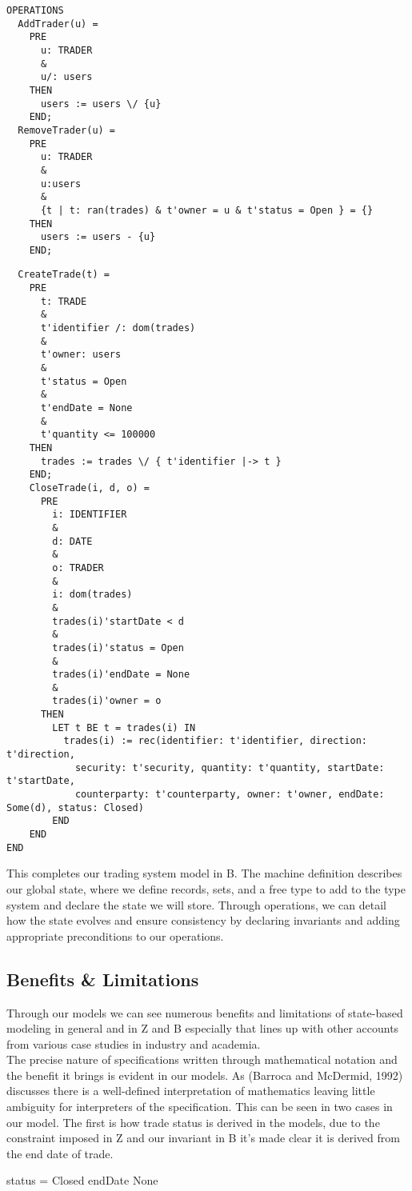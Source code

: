 \documentclass{article}
\begin{document}
\begin{verbatim}
OPERATIONS
  AddTrader(u) = 
    PRE
      u: TRADER
      &
      u/: users
    THEN
      users := users \/ {u}
    END;
  RemoveTrader(u) = 
    PRE
      u: TRADER
      &
      u:users
      &
      {t | t: ran(trades) & t'owner = u & t'status = Open } = {}
    THEN
      users := users - {u}
    END;
\end{verbatim}
\begin{verbatim}
  CreateTrade(t) =
    PRE
      t: TRADE
      &
      t'identifier /: dom(trades)
      &
      t'owner: users 
      &
      t'status = Open 
      &
      t'endDate = None 
      &
      t'quantity <= 100000
    THEN
      trades := trades \/ { t'identifier |-> t }
    END;
    CloseTrade(i, d, o) =
      PRE
        i: IDENTIFIER
        &
        d: DATE
        &
        o: TRADER
        &
        i: dom(trades)
        &
        trades(i)'startDate < d
        &
        trades(i)'status = Open
        &
        trades(i)'endDate = None
        &
        trades(i)'owner = o
      THEN
        LET t BE t = trades(i) IN
          trades(i) := rec(identifier: t'identifier, direction: t'direction, 
            security: t'security, quantity: t'quantity, startDate: t'startDate, 
            counterparty: t'counterparty, owner: t'owner, endDate: Some(d), status: Closed)
        END
    END 
END
\end{verbatim}

\hspace{-0.68cm} This completes our trading system model in B. The machine definition describes our global state, where we define records, sets, and a free type to add to the type system and declare the state we will store. Through operations, we can detail how the state evolves and ensure consistency by declaring invariants and adding appropriate preconditions to our operations.

\pagebreak
\subsection*{Benefits \& Limitations}

Through our models we can see numerous benefits and limitations of state-based modeling in general and in Z and B especially that lines up with other accounts from various case studies in industry and academia.\\
\newline
The precise nature of specifications written through mathematical notation and the benefit it brings is evident in our models. As (Barroca and McDermid, 1992) discusses there is a well-defined interpretation of mathematics leaving little ambiguity for interpreters of the specification. This can be seen in two cases in our model. The first is how trade status is derived in the models, due to the constraint imposed in Z and our invariant in B it's made clear it is derived from the end date of trade. 
\begin{zed}
status = Closed \implies endDate \neq None \\
\end{zed}
\end{document}
